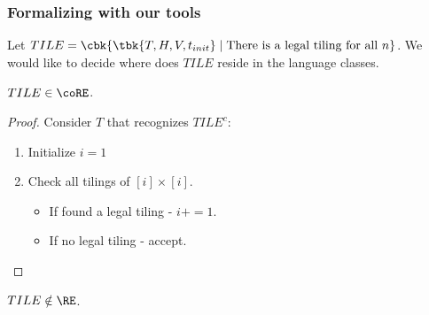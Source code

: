 \subsubsection*{Formalizing with our tools}
Let $TILE = \cbk{\tbk{T,H,V,t_{init}}\mid \text{There is a legal tiling for all }n}$. We would like to decide where does $TILE$ reside in the language classes. 
\begin{prop}
	$TILE\in \coRE$.
\end{prop}
\begin{proof}
	Consider $T$ that recognizes $TILE^c$:
	\begin{enumerate}
		\item Initialize $i = 1$
		\item Check all tilings of $[i]\times [i]$.
		\begin{itemize}
			\item If found a legal tiling - $i+=1$.
			\item If no legal tiling - accept.
		\end{itemize}
	\end{enumerate}
\end{proof}
\begin{prop}
	$TILE\notin \RE$. 
\end{prop}
